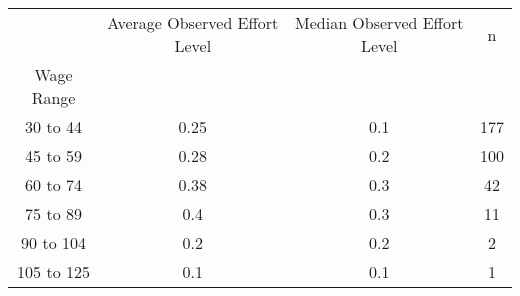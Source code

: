 \begin{tabular}{cccc}
\toprule
{} & Average Observed Effort Level & Median Observed Effort Level &    n \\
Wage Range &                               &                              &      \\
\midrule
30 to 44   &                          0.25 &                          0.1 &  177 \\
45 to 59   &                          0.28 &                          0.2 &  100 \\
60 to 74   &                          0.38 &                          0.3 &   42 \\
75 to 89   &                           0.4 &                          0.3 &   11 \\
90 to 104  &                           0.2 &                          0.2 &    2 \\
105 to 125 &                           0.1 &                          0.1 &    1 \\
\bottomrule
\end{tabular}
